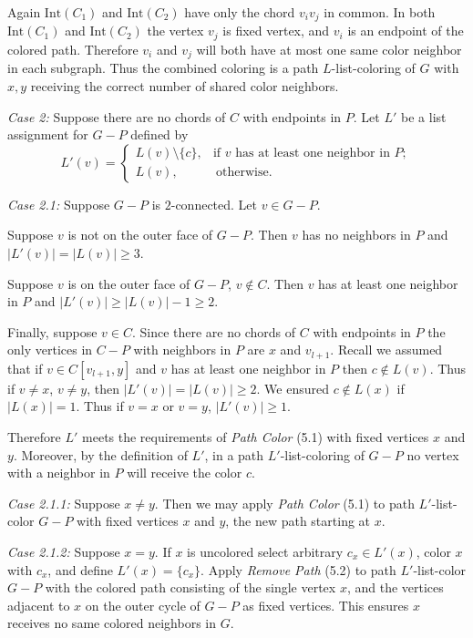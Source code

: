 \documentclass[letterpaper, 12pt]{article}
\theoremstyle{definition}
\theoremstyle{definition}
\theoremstyle{thm}
\theoremstyle{definition}
\begin{document}
Again $\text{Int}(C_1)$ and $\text{Int}(C_2)$ have only the chord $v_iv_j$ in
common. In both $\text{Int}(C_1)$ and $\text{Int}(C_2)$ the vertex $v_j$ is
fixed vertex, and $v_i$ is an endpoint of the colored path. Therefore $v_i$ and
$v_j$ will both have at most one same color neighbor in each subgraph. Thus the
combined coloring is a path $L$-list-coloring of $G$ with $x,y$ receiving the
correct number of shared color neighbors.

\textit{Case 2:} Suppose there are no chords of $C$ with endpoints in $P$.
Let $L'$ be a list assignment for $G-P$ defined by
\[
	L'(v) = \begin{cases}
				L(v)\setminus\{c\}, & \text{if } v \text{ has at least one
				    neighbor in } P;\\
				L(v), & \ \text{otherwise}.
			\end{cases}
\]

\textit{Case 2.1:} Suppose $G-P$ is $2$-connected. Let $v\in G-P$.

Suppose $v$ is not on the outer face of $G-P$. Then $v$ has no neighbors in $P$
and $|L'(v)|=|L(v)|\ge 3$.

Suppose $v$ is on the outer face of $G-P$, $v\not\in C$. Then $v$ has at
least one neighbor in $P$ and $|L'(v)|\ge |L(v)|-1\ge 2$.

Finally, suppose $v\in C$. Since there are no chords of $C$ with endpoints in
$P$ the only vertices in $C-P$ with neighbors in $P$ are $x$ and $v_{l+1}$.
Recall we assumed that if $v\in C[v_{l+1},y]$ and $v$ has at least one neighbor
in $P$ then $c\not\in L(v)$. Thus if $v\ne x$, $v\ne y$, then
$|L'(v)|=|L(v)|\ge 2$. We ensured $c\not\in L(x)$ if $|L(x)|=1$. Thus if $v=x$
or $v=y$, $|L'(v)|\ge 1$.

Therefore $L'$ meets the requirements of \textit{Path Color}
(5.1) with fixed vertices $x$ and $y$. Moreover, by the definition of $L'$, in
a path $L'$-list-coloring of $G-P$ no vertex with a neighbor in $P$ will receive
the color $c$.

\textit{Case 2.1.1:} Suppose $x\ne y$. Then we may apply \textit{Path Color}
(5.1) to path $L'$-list-color $G-P$ with fixed vertices $x$ and $y$, the new
path starting at $x$.

\textit{Case 2.1.2:} Suppose $x=y$. If $x$ is uncolored select arbitrary
$c_x\in L'(x)$, color $x$ with $c_x$, and define $L'(x)=\{c_x\}$. Apply
\textit{Remove Path} (5.2) to path $L'$-list-color $G-P$
with the colored path consisting of the single vertex $x$, and the vertices
adjacent to $x$ on the outer cycle of $G-P$ as fixed vertices. This ensures $x$
receives no same colored neighbors in $G$.
\end{document}
